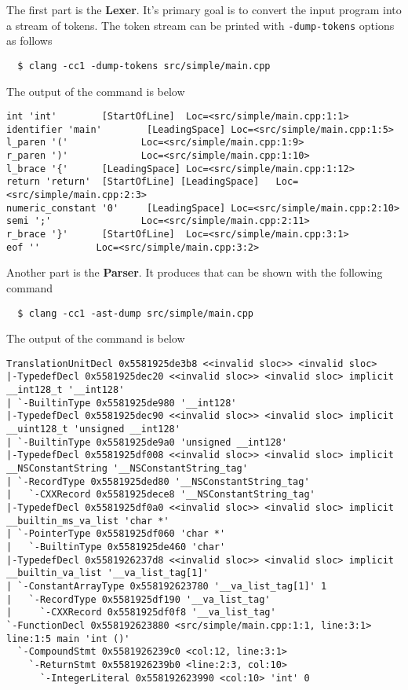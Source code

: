 The first part is the \textbf{Lexer}. It's primary goal is to convert the input
program into a stream of tokens. The token stream can be printed with
\texttt{-dump-tokens} options as follows
\begin{verbatim}
  $ clang -cc1 -dump-tokens src/simple/main.cpp
\end{verbatim}
The output of the command is below
\begin{verbatim}
int 'int'        [StartOfLine]  Loc=<src/simple/main.cpp:1:1>
identifier 'main'        [LeadingSpace] Loc=<src/simple/main.cpp:1:5>
l_paren '('             Loc=<src/simple/main.cpp:1:9>
r_paren ')'             Loc=<src/simple/main.cpp:1:10>
l_brace '{'      [LeadingSpace] Loc=<src/simple/main.cpp:1:12>
return 'return'  [StartOfLine] [LeadingSpace]   Loc=<src/simple/main.cpp:2:3>
numeric_constant '0'     [LeadingSpace] Loc=<src/simple/main.cpp:2:10>
semi ';'                Loc=<src/simple/main.cpp:2:11>
r_brace '}'      [StartOfLine]  Loc=<src/simple/main.cpp:3:1>
eof ''          Loc=<src/simple/main.cpp:3:2>
\end{verbatim}

Another part is the \textbf{Parser}. It produces  that
can be shown with the following command
\begin{verbatim}
  $ clang -cc1 -ast-dump src/simple/main.cpp
  \end{verbatim}
The output of the command is below
\begin{verbatim}
TranslationUnitDecl 0x5581925de3b8 <<invalid sloc>> <invalid sloc>
|-TypedefDecl 0x5581925dec20 <<invalid sloc>> <invalid sloc> implicit __int128_t '__int128'
| `-BuiltinType 0x5581925de980 '__int128'
|-TypedefDecl 0x5581925dec90 <<invalid sloc>> <invalid sloc> implicit __uint128_t 'unsigned __int128'
| `-BuiltinType 0x5581925de9a0 'unsigned __int128'
|-TypedefDecl 0x5581925df008 <<invalid sloc>> <invalid sloc> implicit __NSConstantString '__NSConstantString_tag'
| `-RecordType 0x5581925ded80 '__NSConstantString_tag'
|   `-CXXRecord 0x5581925dece8 '__NSConstantString_tag'
|-TypedefDecl 0x5581925df0a0 <<invalid sloc>> <invalid sloc> implicit __builtin_ms_va_list 'char *'
| `-PointerType 0x5581925df060 'char *'
|   `-BuiltinType 0x5581925de460 'char'
|-TypedefDecl 0x5581926237d8 <<invalid sloc>> <invalid sloc> implicit __builtin_va_list '__va_list_tag[1]'
| `-ConstantArrayType 0x558192623780 '__va_list_tag[1]' 1
|   `-RecordType 0x5581925df190 '__va_list_tag'
|     `-CXXRecord 0x5581925df0f8 '__va_list_tag'
`-FunctionDecl 0x558192623880 <src/simple/main.cpp:1:1, line:3:1> line:1:5 main 'int ()'
  `-CompoundStmt 0x5581926239c0 <col:12, line:3:1>
    `-ReturnStmt 0x5581926239b0 <line:2:3, col:10>
      `-IntegerLiteral 0x558192623990 <col:10> 'int' 0
\end{verbatim}


